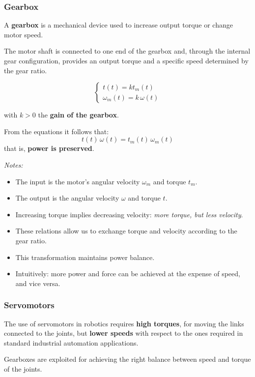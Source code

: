 \hfill

\subsubsection*{Gearbox}

A \textbf{gearbox} is a mechanical device used to increase output torque or change motor speed.  

The motor shaft is connected to one end of the gearbox and, through the internal gear configuration, provides an output torque and a specific speed determined by the gear ratio.  

\[
\begin{cases}
t(t) = k t_m(t) \\
\omega_m(t) = k \, \omega(t)
\end{cases}
\]

with $k > 0$ the \textbf{gain of the gearbox}.  

From the equations it follows that:
\[
t(t)\,\omega(t) = t_m(t)\,\omega_m(t)
\]
that is, \textbf{power is preserved}.  

\textit{Notes:}  
\begin{itemize}
    \item The input is the motor’s angular velocity $\omega_m$ and torque $t_m$.  
    \item The output is the angular velocity $\omega$ and torque $t$.  
    \item Increasing torque implies decreasing velocity: \textit{more torque, but less velocity}.  
    \item These relations allow us to exchange torque and velocity according to the gear ratio.  
    \item This transformation maintains power balance.  
    \item Intuitively: more power and force can be achieved at the expense of speed, and vice versa.  
\end{itemize}

\hfill

\subsubsection*{Servomotors}

The use of servomotors in robotics requires \textbf{high torques}, for moving the links connected to the joints, but \textbf{lower speeds} with respect to the ones required in standard industrial automation applications.  

Gearboxes are exploited for achieving the right balance between speed and torque of the joints.  

